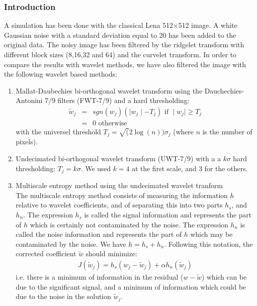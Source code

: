 \documentclass[11pt,a4paper]{article}
\begin{document}
\subsubsection{Introduction}
A simulation has been done with the classical
Lena 512$\times$512 image. A white Gaussian noise 
with a standard deviation equal to 20 has been added to the
original data. The noisy image has been filtered by the ridgelet 
transform with different block sizes (8,16,32 and 64) 
and the curvelet transform. In order to compare the 
results with wavelet methods, we have also filtered the image
with the following wavelet based methods:
\begin{enumerate}
\item Mallat-Daubechies bi-orthogonal wavelet transform using the Dauchechies-
Antonini 7/9 filters \cite{wave:antonini92} (FWT-7/9) 
and a hard thresholding:
\begin{eqnarray}
\tilde w_j & = & sgn(w_j) ( \mid w_j \mid - T_j) \mbox{ if } \mid w_j \mid 
\geq  T_j  \\
         & = & 0  \mbox{ otherwise} 
\end{eqnarray}
with the universel threshold  \cite{rest:donoho93_1,rest:donoho93_2} 
$T_j =  \sqrt(2\log(n))\sigma_j$ (where $n$ 
is the number of pixels).
\item Undecimated bi-orthogonal wavelet transform (UWT-7/9) with a
a $k\sigma$ hard thresholding: $T_j = k \sigma$. We used $k=4$ at the
first scale, and 3 for the others.
\item Multiscale entropy method using the undecimated wavelet tranform\\
The multiscale entropy method \cite{starck:sta98_2} consists of measuring 
the information $h$
relative to wavelet coefficients, and of separating this into two parts $h_s$,
and $h_n$. The expression 
$h_s$ is called the signal information and represents the part
of $h$ which is certainly not contaminated by the noise.  The 
expression $h_n$ is 
called the noise information and represents the part
of $h$ which may be contaminated by the noise.  We have $h = h_s+ h_n$.
Following this notation, the corrected coefficient $\tilde w$ should
minimize:
\begin{eqnarray}
J(\tilde w_j) = h_s(w_j-\tilde w_j) + \alpha h_n(\tilde w_j)
\label{eqn_func2}
\end{eqnarray}
i.e. there is a minimum of information in the residual ($w-\tilde w$)
which can be due to the significant signal, and a minimum of information
which could be due to the noise in the solution $ \tilde w_j$.

\end{enumerate}
\end{document}
